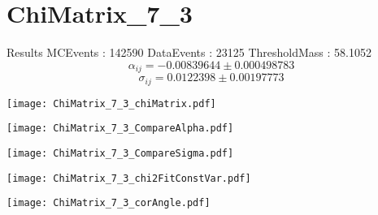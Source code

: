 \documentclass[a4paper,12pt]{article}
\begin{document}
\section{ChiMatrix\_7\_3}
\begin{minipage}{0.49\linewidth} Results \newline
MCEvents : 142590\newline
DataEvents : 23125 \newline
ThresholdMass : 58.1052\\
$$\alpha_{ij} = -0.00839644\pm 0.000498783$$
$$\sigma_{ij} = 0.0122398\pm 0.00197773$$
\end{minipage}\hfill
\begin{minipage}{0.49\linewidth} 
\texttt{[image: ChiMatrix\_7\_3\_chiMatrix.pdf]}\\
\end{minipage}
\hfill
\begin{minipage}{0.49\linewidth} 
\texttt{[image: ChiMatrix\_7\_3\_CompareAlpha.pdf]}\\
\end{minipage}
\hfill
\begin{minipage}{0.49\linewidth} 
\texttt{[image: ChiMatrix\_7\_3\_CompareSigma.pdf]}\\
\end{minipage}
\begin{minipage}{0.49\linewidth} 
\texttt{[image: ChiMatrix\_7\_3\_chi2FitConstVar.pdf]}\\
\end{minipage}
\hfill
\begin{minipage}{0.49\linewidth} 
\texttt{[image: ChiMatrix\_7\_3\_corAngle.pdf]}\\
\end{minipage}
\end{document}
